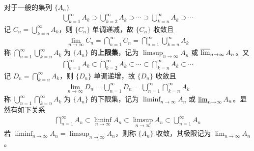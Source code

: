 \documentclass[../../main.tex]{subfiles}
\begin{document}
\begin{definition}[上限集和下限集]
对于一般的集列 $\{A_n\}$
\begin{align*}
\bigcup_{k = 1}^{\infty} A_k \supset \bigcup_{k = 2}^{\infty} A_k \supset \cdots \supset \bigcup_{k = n}^{\infty} A_k \supset \cdots
\end{align*}
记 $C_n = \bigcup_{k = n}^{\infty} A_k$，则 $\{C_n\}$ 单调递减，故 $\{C_n\}$ 收敛且
\begin{align*}
\lim_{n \to \infty} C_n = \bigcap_{n = 1}^{\infty} C_n = \bigcap_{n = 1}^{\infty} \bigcup_{k = n}^{\infty} A_k
\end{align*}
称 $\bigcap_{n = 1}^{\infty} \bigcup_{k = n}^{\infty} A_k$ 为 $\{A_n\}$ 的\textbf{上限集}，记为 $\limsup_{n \to \infty} A_n$ 或 $\varlimsup_{n \to \infty} A_n$。又
\begin{align*}
\bigcap_{k = 1}^{\infty} A_k \subset \bigcap_{k = 2}^{\infty} A_k \subset \cdots \subset \bigcap_{k = n}^{\infty} A_k \subset \cdots
\end{align*}
记 $D_n = \bigcap_{k = n}^{\infty} A_k$，则 $\{D_n\}$ 单调递增，故 $\{D_n\}$ 收敛且
\begin{align*}
\lim_{n \to \infty} D_n = \bigcup_{n = 1}^{\infty} D_n = \bigcup_{n = 1}^{\infty} \bigcap_{k = n}^{\infty} A_k
\end{align*}
称 $\bigcup_{n = 1}^{\infty} \bigcap_{k = n}^{\infty} A_k$ 为 $\{A_n\}$ 的下限集，记为 $\liminf_{n \to \infty} A_n$ 或 $\varliminf_{n \to \infty} A_n$。显然有如下关系
\begin{align*}
\bigcap_{n = 1}^{\infty} A_n \subset \liminf_{n \to \infty} A_n \subset \limsup_{n \to \infty} A_n \subset \bigcup_{n = 1}^{\infty} A_n
\end{align*}
若 $\liminf_{n \to \infty} A_n = \limsup_{n \to \infty} A_n$，则称 $\{A_n\}$ 收敛，其极限记为 $\lim_{n \to \infty} A_n$。 
\end{definition}
\end{document}
